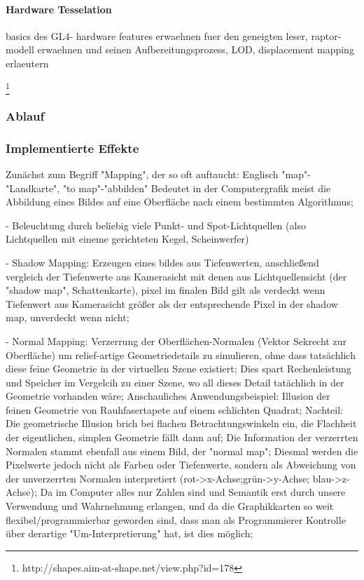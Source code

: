 	
	
	\paragraph{Hardware Tesselation}
	basics des GL4- hardware features erwaehnen fuer den geneigten leser, raptor-modell erwaehnen und seinen 		
	Aufbereitungsprozess, LOD, displacement mapping erlaeutern	
	
	\footnote{http://shapes.aim-at-shape.net/view.php?id=178}
	
	
\subsubsection{Ablauf}	

	
\subsubsection{Implementierte Effekte}
	\label{sec:genericVisualEffects}

Zunächst zum Begriff "Mapping", der so oft auftaucht: Englisch "map"-"Landkarte", "to map"-"abbilden" Bedeutet in der Computergrafik meist die Abbildung eines Bildes auf eine Oberfläche nach einem bestimmten Algorithmus;

- Beleuchtung durch beliebig viele Punkt- und Spot-Lichtquellen (also Lichtquellen mit eineme gerichteten Kegel, Scheinwerfer)

- Shadow Mapping: Erzeugen eines bildes aus Tiefenwerten, anschließend vergleich der Tiefenwerte aus Kamerasicht mit denen aus Lichtquellensicht (der "shadow map", Schattenkarte), pixel im finalen Bild gilt als verdeckt wenn Tiefenwert aus Kamerasicht größer als der entsprechende Pixel in der shadow map, unverdeckt wenn nicht;

- Normal Mapping: Verzerrung der Oberflächen-Normalen (Vektor Sekrecht zur Oberfläche) um relief-artige Geometriedetails zu simulieren, ohne dass tatsächlich diese feine Geometrie in der virtuellen Szene existiert; Dies spart Rechenleistung und Speicher im Vergelcih zu einer Szene, wo all dieses Detail tatächlich in der Geometrie vorhanden wäre; Anschauliches Anwendungsbeispiel: Illusion der feinen Geometrie von Rauhfasertapete auf einem schlichten Quadrat; Nachteil: Die geometrische Illusion brich bei flachen Betrachtungswinkeln ein, die Flachheit der eigentlichen, simplen Geometrie fällt dann auf; Die Information der verzerrten Normalen stammt ebenfall aus einem Bild, der "normal map"; Diesmal werden die Pixelwerte jedoch nicht als Farben oder Tiefenwerte, sondern als Abweichung von der unverzerrten Normalen interpretiert (rot->x-Achse;grün->y-Achse; blau->z-Achse); Da im Computer alles nur Zahlen sind und Semantik erst durch unsere Verwendung und Wahrnehmung erlangen, und da die Graphikkarten so weit flexibel/programmierbar geworden sind, dass man als Programmierer Kontrolle über derartige "Um-Interpretierung" hat, ist dies möglich;

